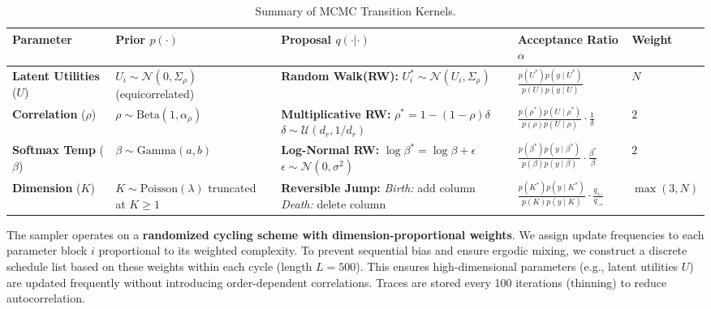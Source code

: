 \documentclass{article}
\theoremstyle{plain}
\theoremstyle{definition}
\theoremstyle{remark}
\begin{document}
\begin{table}[h]
\centering
\small
\renewcommand{\arraystretch}{1.5}
\caption{Summary of MCMC Transition Kernels.}
\label{tab:mcmc_proposals}
\begin{tabular}{@{}l p{3.2cm} p{3.5cm} p{3.2cm} l@{}}
\toprule
\textbf{Parameter} & \textbf{Prior} $p(\cdot)$ & \textbf{Proposal} $q(\cdot|\cdot)$ & \textbf{Acceptance Ratio} $\alpha$ & \textbf{Weight} \\ 
\midrule

\textbf{Latent Utilities} ($U$) 
& $U_i \sim \mathcal{N}(0, \Sigma_\rho)$ \newline (equicorrelated)
& \textbf{Random Walk(RW):} \newline $U_i^* \sim \mathcal{N}(U_i, \Sigma_\rho)$
& $\frac{p(U^*) p(y \mid U^*)}{p(U) p(y \mid U)}$ 
& $N$ \\ 
\midrule

\textbf{Correlation} ($\rho$) 
& $\rho \sim \mathrm{Beta}(1, \alpha_\rho)$
& \textbf{Multiplicative RW:} \newline $\rho^* = 1 - (1{-}\rho)\delta$ \newline $\delta \sim \mathcal{U}(d_r, 1/d_r)$
& $\frac{p(\rho^*) p(U \mid \rho^*)}{p(\rho) p(U \mid \rho)} \cdot \frac{1}{\delta}$ 
& $2$ \\ 
\midrule

\textbf{Softmax Temp} ($\beta$) 
& $\beta \sim \mathrm{Gamma}(a, b)$
& \textbf{Log-Normal RW:} \newline $\log \beta^* = \log \beta + \epsilon$ \newline $\epsilon \sim \mathcal{N}(0, \sigma^2)$
& $\frac{p(\beta^*) p(y \mid \beta^*)}{p(\beta) p(y \mid \beta)} \cdot \frac{\beta^*}{\beta}$ 
& $2$ \\ 
\midrule

\textbf{Dimension} ($K$) 
& $K \sim \mathrm{Poisson}(\lambda)$ \newline truncated at $K \geq 1$
& \textbf{Reversible Jump:} \newline \textit{Birth:} add column \newline \textit{Death:} delete column
& $\frac{p(K^*) p(y \mid K^*)}{p(K) p(y \mid K)} \cdot \frac{q_{\leftarrow}}{q_{\rightarrow}}$ 
& $\max(3,N)$ \\ 
\bottomrule
\end{tabular}
\end{table}

The sampler operates on a \textbf{randomized cycling scheme with dimension-proportional weights}. We assign update frequencies to each parameter block $i$ proportional to its weighted complexity. To prevent sequential bias and ensure ergodic mixing, we construct a discrete schedule list based on these weights within each cycle (length $L=500$). This ensures high-dimensional parameters (e.g., latent utilities $U$) are updated frequently without introducing order-dependent correlations. Traces are stored every 100 iterations (thinning) to reduce autocorrelation.
\end{document}
